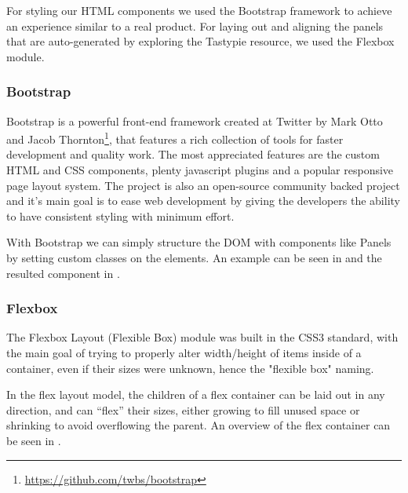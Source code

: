 For styling our HTML components we used the Bootstrap framework to achieve an experience similar to a real product. For laying out and aligning the panels that are auto-generated by exploring the Tastypie resource, we used the Flexbox module. 

\subsubsection{Bootstrap}
\label{sub-sub-sec:bootstrap}

Bootstrap is a powerful front-end framework created at Twitter by Mark Otto and Jacob Thornton\footnote{\url{https://github.com/twbs/bootstrap}}, that features a rich collection of tools for faster development and quality work. The most appreciated features are the custom HTML and CSS components, plenty javascript plugins and a popular responsive page layout system. The project is also an open-source community backed project and it's main goal is to ease web development by giving the developers the ability to have consistent styling with minimum effort.

With Bootstrap we can simply structure the DOM with components like Panels by setting custom classes on the elements. An example can be seen in  and the resulted component in .





\subsubsection{Flexbox}
\label{sub-sub-sec:flexbox}

The Flexbox Layout (Flexible Box) module was built in the CSS3 standard, with the main goal of trying to properly alter width/height of items inside of a container, even if their sizes were unknown, hence the "flexible box" naming.

In the flex layout model, the children of a flex container can be laid out in any direction, and can “flex” their sizes, either growing to fill unused space or shrinking to avoid overflowing the parent\cite{flexbox}. An overview of the flex container can be seen in .


